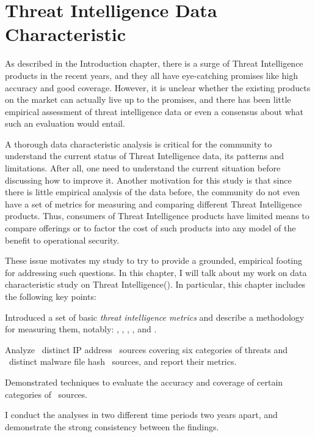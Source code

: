 \chapter{Threat Intelligence Data Characteristic}
\label{chapter:data_character}

As described in the Introduction 
chapter, there is a surge of Threat Intelligence products in the 
recent years, and they all have eye-catching promises like high 
accuracy and good coverage. However, it is unclear whether the
existing products on the market can actually live up to the 
promises, and there has been little empirical assessment of threat
intelligence data or even a consensus about what such an
evaluation would entail. 

A thorough data characteristic analysis is critical for the 
community to understand the current status of Threat Intelligence 
data, its patterns and limitations. After all, one need to understand
the current situation before discussing how to improve it. 
Another motivation for this 
study is that since there is little empirical analysis of the 
data before, the community do not even have a set of metrics for
measuring and comparing different Threat Intelligence products. 
Thus, consumers of Threat Intelligence products have limited means 
to compare offerings or to factor the cost of such products into 
any model of the benefit to operational security.

These issue motivates my study to try to provide a grounded,
empirical footing for addressing such questions. 
In this chapter, I will talk about my work on data characteristic
study on Threat Intelligence(\ti). In particular, this chapter includes 
the following key points:
\begin{prettylist}
\item Introduced a set of basic \emph{threat intelligence metrics}
and describe a methodology for measuring them, notably: 
,
, ,
,  and .
\item Analyze \numipfeeds\ distinct IP address \ti\ sources covering
six categories of threats and \numhashfeeds\ distinct malware file hash
\ti\ sources, and report their metrics.
\item Demonstrated techniques to evaluate the accuracy and coverage of
certain categories of \ti\ sources.
\item I conduct the analyses in two different time periods two 
years apart, and demonstrate the strong consistency between the 
findings.
\end{prettylist}

